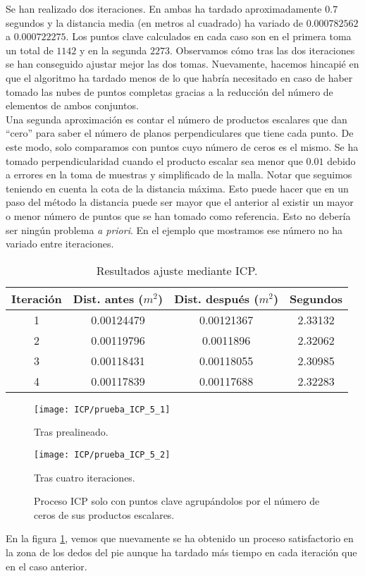 Se han realizado dos iteraciones. En ambas ha tardado aproximadamente $ 0.7 $ segundos y la distancia media (en metros al cuadrado) ha variado de $ 0.000782562 $ a $ 0.000722275 $. Los puntos clave calculados en cada caso son en el primera toma un total de $ 1142 $ y en la segunda $ 2273 $. Observamos cómo tras las dos iteraciones se han conseguido ajustar mejor las dos tomas. Nuevamente, hacemos hincapié en que el algoritmo ha tardado menos de lo que habría necesitado en caso de haber tomado las nubes de puntos completas gracias a la reducción del número de elementos de ambos conjuntos. \\

Una segunda aproximación es contar el número de productos escalares que dan ``cero'' para saber el número de planos perpendiculares que tiene cada punto. De este modo, solo comparamos con puntos cuyo número de ceros es el mismo. Se ha tomado perpendicularidad cuando el producto escalar sea menor que $ 0.01 $ debido a errores en la toma de muestras y simplificado de la malla. Notar que seguimos teniendo en cuenta la cota de la distancia máxima. Esto puede hacer que en un paso del método la distancia puede ser mayor que el anterior al existir un mayor o menor número de puntos que se han tomado como referencia. Esto no debería ser ningún problema \textit{a priori}. En el ejemplo que mostramos ese número no ha variado entre iteraciones.

\begin{table}[h!]
	\centering
	\begin{tabular}{| c | c | c | c |} 
		\hline
		Iteración & Dist. antes ($ m^2 $)  & Dist. después ($ m^2 $) & Segundos \\
		\hline
		1 &  0.00124479 &  0.00121367 & 2.33132\\			 
		2 & 0.00119796 &  0.0011896 &   2.32062\\	
		3 &  0.00118431 & 0.00118055  & 2.30985\\
		4 & 0.00117839 &  0.00117688 & 2.32283\\
		\hline
	\end{tabular}
	\caption{Resultados ajuste mediante ICP.}
\end{table}

\begin{figure}[th!]
	
	\begin{minipage}[b]{0.5\textwidth}
		\centering
		\texttt{[image: ICP/prueba\_ICP\_5\_1]} 
		\caption*{Tras prealineado.}
	\end{minipage}
	\begin{minipage}[b]{0.5\textwidth}
		\centering
		\texttt{[image: ICP/prueba\_ICP\_5\_2]}
		\caption*{Tras cuatro iteraciones.}
		
	\end{minipage}
	
	\caption{Proceso ICP solo con puntos clave agrupándolos por el número de ceros de sus productos escalares.}
	\label{fig:ICPej5}
\end{figure}

En la figura \ref{fig:ICPej5}, vemos que nuevamente se ha obtenido un proceso satisfactorio en la zona de los dedos del pie aunque ha tardado más tiempo en cada iteración que en el caso anterior.